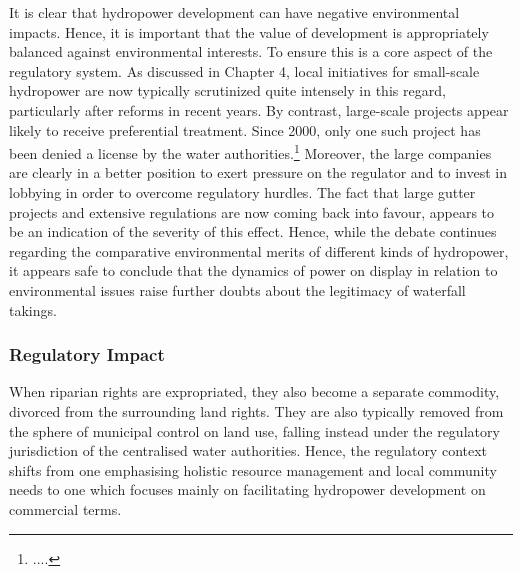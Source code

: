 It is clear that hydropower development can have negative environmental impacts. Hence, it is important that the value of development is appropriately balanced against environmental interests. To ensure this is a core aspect of the regulatory system. As discussed in Chapter 4, local initiatives for small-scale hydropower are now typically scrutinized quite intensely in this regard, particularly after reforms in recent years. By contrast, large-scale projects appear likely to receive preferential treatment. Since 2000, only one such project has been denied a license by the water authorities.\footnote{....} Moreover, the large companies are clearly in a better position to exert pressure on the regulator and to invest in lobbying in order to overcome regulatory hurdles. The fact that large gutter projects and extensive regulations are now coming back into favour, appears to be an indication of the severity of this effect. Hence, while the debate continues regarding the comparative environmental merits of different kinds of hydropower, it appears safe to conclude that the dynamics of power on display in relation to environmental issues raise further doubts about the legitimacy of waterfall takings.


\subsubsection{Regulatory Impact}

When riparian rights are expropriated, they also become a separate commodity, divorced from the surrounding land rights. They are also typically removed from the sphere of municipal control on land use, falling instead under the regulatory jurisdiction of the centralised water authorities. 
Hence, the regulatory context shifts from one emphasising holistic resource management and local community needs to one which focuses mainly on facilitating hydropower development on commercial terms. 

